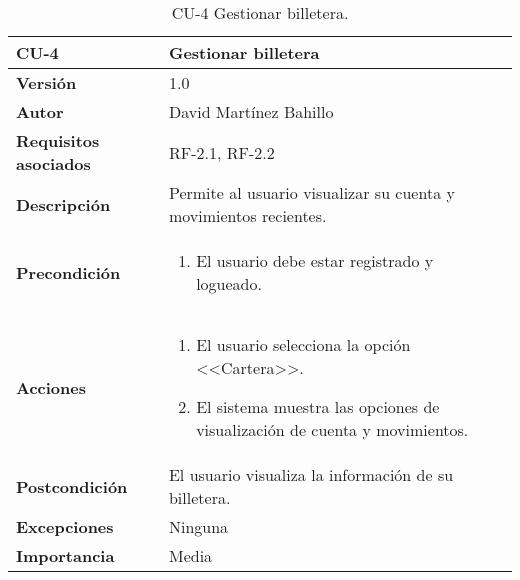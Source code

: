 \begin{table}[p]
	\centering
	\begin{tabularx}{\linewidth}{ p{} p{} }
		\toprule
		\textbf{CU-4}    & \textbf{Gestionar billetera}\\
		\midrule
		\textbf{Versión}              & 1.0    \\
		\textbf{Autor}                & David Martínez Bahillo \\
		\textbf{Requisitos asociados} & RF-2.1, RF-2.2 \\
		\textbf{Descripción}          & Permite al usuario visualizar su cuenta y movimientos recientes. \\
		\textbf{Precondición}         &  
		\begin{enumerate}
			\def\labelenumi{\arabic{enumi}.}
			\tightlist
			\item El usuario debe estar registrado y logueado.
		\end{enumerate}\\
		\textbf{Acciones}             &
		\begin{enumerate}
			\def\labelenumi{\arabic{enumi}.}
			\tightlist
			\item El usuario selecciona la opción <<Cartera>>.
			\item El sistema muestra las opciones de visualización de cuenta y movimientos.
		\end{enumerate}\\
		\textbf{Postcondición}        & El usuario visualiza la información de su billetera. \\
		\textbf{Excepciones}          & Ninguna \\
		\textbf{Importancia}          & Media  \\
		\bottomrule
	\end{tabularx}
	\caption{CU-4 Gestionar billetera.}
\end{table}


